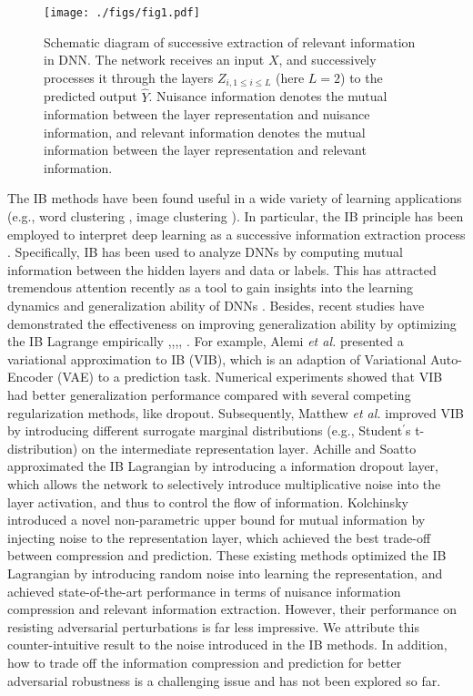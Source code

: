 \documentclass[10pt,journal,compsoc]{IEEEtran}
\begin{document}
\begin{figure}
  \centering
  \texttt{[image: ./figs/fig1.pdf]}
  \caption{Schematic diagram of successive extraction of relevant information in DNN. The network receives an input $X$, and successively processes it through the layers $Z_{i,1 \leq i \leq L}$ (here $L=2$) to the predicted output $\hat{Y}$. Nuisance information denotes the mutual information between the layer representation and nuisance information, and relevant information denotes the mutual information between the layer representation and relevant information.}
\label{img:fig1}
\end{figure}


The IB methods have been found useful in a wide variety of learning applications (e.g., word clustering \cite{Slonim2000DocumentCU}, image clustering \cite{Goldberger2002UnsupervisedIC}). In particular, the IB principle has been employed to interpret deep learning as a successive information extraction process \cite{Tishby2015DeepLA}. Specifically, IB has been used to analyze DNNs by computing mutual information between the hidden layers and data or labels. This has attracted tremendous attention recently as a tool to gain insights into the learning dynamics and generalization ability of DNNs \cite{ShwartzZiv2017OpeningTB,pmlr-v97-goldfeld19a,Saxe2018OnTI}.
Besides, recent studies have demonstrated the effectiveness on improving generalization ability by optimizing the IB Lagrange empirically  \cite{Alemi2017DeepVI},\cite{Kingma2014AutoEncodingVB},\cite{chalk2016relevant},\cite{Achille2018InformationDL}, \cite{Amjad2020LearningRF}. For example, Alemi \emph{et al.} \cite{Alemi2017DeepVI} presented a variational approximation to IB (VIB), which is an adaption of Variational Auto-Encoder (VAE) \cite{Kingma2014AutoEncodingVB} to a prediction task. Numerical experiments showed that VIB had better generalization performance compared with several competing regularization methods, like dropout. Subsequently, Matthew \emph{et al.} \cite{chalk2016relevant} improved VIB by introducing different surrogate marginal distributions (e.g., Student$^{'}$s t-distribution) on the intermediate representation layer. Achille and Soatto \cite{Achille2018InformationDL} approximated the IB Lagrangian by introducing a information dropout layer, which allows the network to selectively introduce multiplicative noise into the layer activation, and thus to control the flow of information. Kolchinsky \cite{Kolchinsky2019NonlinearIB} introduced a novel non-parametric upper bound for mutual information by injecting noise to the representation layer, which achieved the best trade-off between compression and prediction. These existing methods optimized the IB Lagrangian by introducing random noise into learning the  representation, and achieved state-of-the-art performance in terms of nuisance information compression and relevant information extraction. However, their performance on resisting adversarial perturbations is far less impressive. We attribute this counter-intuitive result to the noise introduced in the IB methods. In addition, how to trade off the information compression and prediction for better adversarial robustness is a challenging issue and has not been explored so far.
\end{document}
